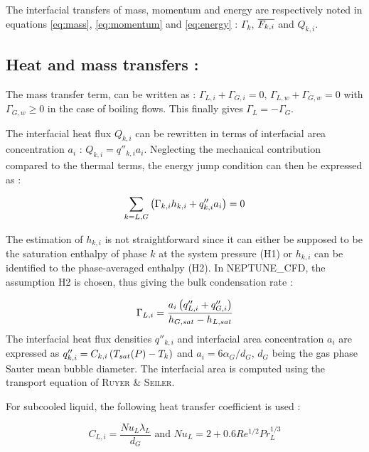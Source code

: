 The interfacial transfers of mass, momentum and energy are respectively noted in equations \ref{eq:mass}, \ref{eq:momentum} and \ref{eq:energy} : $\Gamma_{k}$, $\overline{F_{k,i}}$ and $Q_{k,i}$.

\subsection{Heat and mass transfers :}


The mass transfer term, can be written as : $\Gamma_{L,i} + \Gamma_{G,i} = 0$, $\Gamma_{L,w} + \Gamma_{G,w} = 0$ with $\Gamma_{G,w} \geq 0$ in the case of boiling flows. This finally gives $\Gamma_{L}=-\Gamma_{G}$.

The interfacial heat flux $Q_{k,i}$ can be rewritten in terms of interfacial area concentration $a_{i}$ : $Q_{k,i}=q''_{k,i}a_{i}$. Neglecting the mechanical contribution compared to the thermal terms, the energy jump condition can then be expressed as :

\begin{equation}
\label{eq:energy_jump}
\sum_{k=L,G}\left( \Gamma_{k,i}h_{k,i} + q''_{k,i}a_{i} \right)=0
\end{equation}

The estimation of $h_{k,i}$ is not straightforward since it can either be supposed to be the saturation enthalpy of phase $k$ at the system pressure (H1) or $h_{k,i}$ can be identified to the phase-averaged enthalpy (H2). In NEPTUNE\_CFD, the assumption H2 is chosen, thus giving the bulk condensation rate :

\begin{equation}
\label{eq:condensation_rate}
\Gamma_{L,i}=\frac{a_{i}\left( q''_{L,i}+q''_{G,i} \right)}{h_{G,sat}-h_{L,sat}}
\end{equation}
The interfacial heat flux densities $q''_{k,i}$ and interfacial area concentration $a_{i}$ are expressed as $q''_{k,i}=C_{k,i}\left( T_{sat}(P)-T_{k} \right)$ and $a_{i}=6 \alpha_{G}/d_{G}$, $d_{G}$ being the gas phase Sauter mean bubble diameter. The interfacial area is computed using the transport equation of \textsc{Ruyer} \& \textsc{Seiler}\cite{ruyer2009}.

For subcooled liquid, the following heat transfer coefficient is used \cite{manon2000}:

\begin{equation}
\label{eq:subcooled_HT}
C_{L,i}=\frac{Nu_{L}\lambda_{L}}{d_{G}} \text{ and } Nu_{L}=2+0.6Re^{1/2}Pr_{L}^{1/3}
\end{equation}

